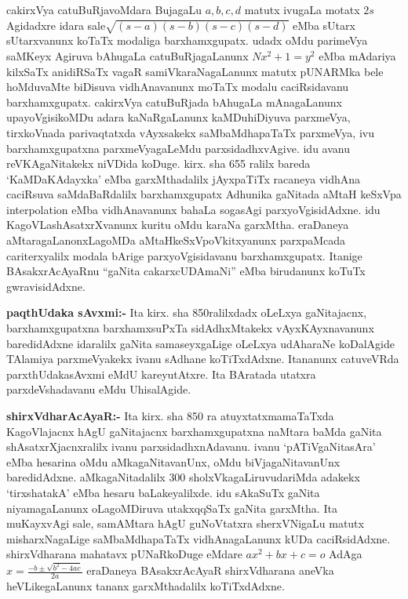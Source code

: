 cakirxVya catuBuRjavoMdara BujagaLu $a, b, c, d$ matutx ivugaLa motatx $2s$  Agidadxre idara  sale$\sqrt{(s-a)(s-b)(s-c)(s-d)}$
eMba sUtarx sUtarxvanunx koTaTx modaliga barxhamxgupatx. udadx oMdu parimeVya saMKeyx Agiruva bAhugaLa catuBuRjagaLanunx $Nx^{2}+1=y^{2}$ eMba mAdariya kilxSaTx anidiRSaTx vagaR samiVkaraNagaLanunx matutx pUNARMka bele hoMduvaMte biDisuva vidhAnavanunx moTaTx modalu caciRsidavanu barxhamxgupatx. cakirxVya catuBuRjada bAhugaLa mAnagaLanunx upayoVgisikoMDu adara kaNaRgaLanunx kaMDuhiDiyuva parxmeVya, tirxkoVnada parivaqtatxda vAyxsakekx saMbaMdhapaTaTx parxmeVya, ivu barxhamxgupatxna parxmeVyagaLeMdu parxsidadhxvAgive. idu avanu reVKAgaNitakekx niVDida koDuge. kirx. sha {\rm 655} ralilx bareda `KaMDaKAdayxka' eMba garxMthadalilx jAyxpaTiTx racaneya vidhAna caciRsuva saMdaBaRdalilx barxhamxgupatx Adhunika gaNitada aMtaH keSxVpa {\rm interpolation} eMba vidhAnavanunx bahaLa sogasAgi parxyoVgisidAdxne. idu KagoVLashAsatxrXvanunx kuritu oMdu karaNa garxMtha. eraDaneya aMtaragaLanonxLagoMDa aMtaHkeSxVpoVkitxyanunx parxpaMcada cariterxyalilx modala bArige parxyoVgisidavanu barxhamxgupatx. Itanige BAsakxrAcAyaRnu ``gaNita cakarxcUDAmaNi'' eMba birudanunx koTuTx gwravisidAdxne. 

\textbf{paqthUdaka sAvxmi:-} Ita kirx. sha {\rm 850}ralilxdadx oLeLxya gaNitajacnx, barxhamxgupatxna barxhamxsuPxTa sidAdhxMtakekx vAyxKAyxnavanunx baredidAdxne idaralilx gaNita samaseyxgaLige oLeLxya udAharaNe koDalAgide TAlamiya parxmeVyakekx ivanu sAdhane koTiTxdAdxne. Itananunx catuveVRda parxthUdakasAvxmi eMdU kareyutAtxre. Ita BAratada utatxra parxdeVshadavanu eMdu UhisalAgide.

\textbf{shirxVdharAcAyaR:-} Ita kirx. sha {\rm 850} ra atuyxtatxmamaTaTxda KagoVlajacnx hAgU gaNitajacnx barxhamxgupatxna naMtara baMda gaNita shAsatxrXjacnxralilx ivanu parxsidadhxnAdavanu. ivanu `pATiVgaNitasAra' eMba hesarina oMdu aMkagaNitavanUnx, oMdu biVjagaNitavanUnx baredidAdxne. aMkagaNitadalilx {\rm 300} sholxVkagaLiruvudariMda adakekx `tirxshatakA' eMba hesaru baLake\-yalilxde. idu sAkaSuTx gaNita niyamagaLanunx oLagoMDiruva utakxqqSaTx gaNita garxMtha. Ita muKayxvAgi sale, samAMtara hAgU guNoVtatxra sherxVNigaLu matutx misharxNagaLige saMbaMdhapaTaTx vidhAnagaLanunx kUDa caciRsidAdxne. shirxVdharana mahatavx pUNaRkoDuge eMdare $ax^{2}+bx+c=o$ AdAga   $x= \frac{-b \pm \sqrt{b^{2}-4ac}}{2a}$
eraDaneya BAsakxrA\-cAyaR shirxVdharana aneVka heVLikegaLanunx tananx garxMthadalilx koTiTxdAdxne.

